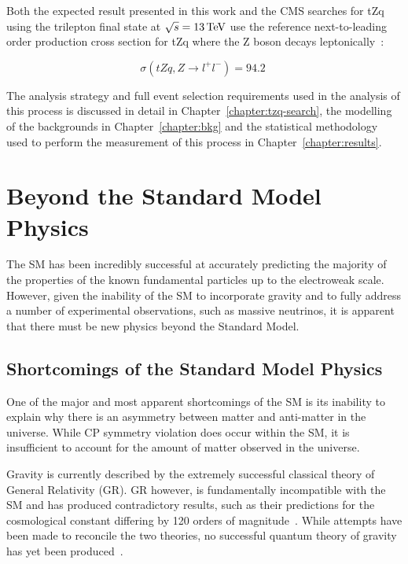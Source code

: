 Both the expected result presented in this work and the CMS searches for tZq using the trilepton final state at $\sqrt{s} = 13\,\text{Te\hspace{-.08em}V}$ use the reference next-to-leading order production cross section for tZq where the Z boson decays leptonically~\cite{Sirunyan:2017nbr}:

\begin{equation}
\sigma ( tZq, Z \rightarrow l^{+} l^{-}) = \textrm{94.2} \;
\label{tZqCrossSection}
\end{equation}

The analysis strategy and full event selection requirements used in the analysis of this process is discussed in detail in Chapter~\ref{chapter:tzq-search}, the modelling of the backgrounds in Chapter~\ref{chapter:bkg} and the statistical methodology used to perform the measurement of this process in Chapter~\ref{chapter:results}.

\section{Beyond the Standard Model Physics}\label{sec:bsm}
The SM has been incredibly successful at accurately predicting the majority of the properties of the known fundamental particles up to the electroweak scale.
However, given the inability of the SM to incorporate gravity and to fully address a number of experimental observations, such as massive neutrinos, it is apparent that there must be new physics beyond the Standard Model.

\subsection{Shortcomings of the Standard Model Physics}\label{subsec:shortcomings}
One of the major and most apparent shortcomings of the SM is its inability to explain why there is an asymmetry between matter and anti-matter in the universe.
While CP symmetry violation does occur within the SM, it is insufficient to account for the amount of matter observed in the universe.

Gravity is currently described by the extremely successful classical theory of General Relativity (GR).
GR however, is fundamentally incompatible with the SM and  has produced contradictory results, such as their predictions for the cosmological constant differing by 120 orders of magnitude~\cite{Adler:1995vd}.
While attempts have been made to reconcile the two theories, no successful quantum theory of gravity has yet been produced~\cite{Sola:2013gha}.	

